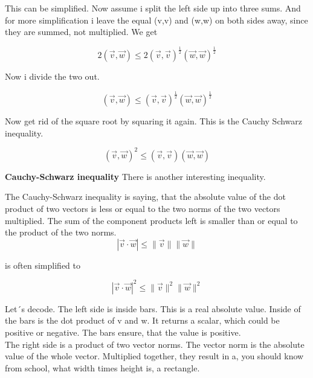 \documentclass[a4paper]{article}
\begin{document}
\begin{Example}
This can be simplified. Now assume i split the left side up into three sums. And for more simplification i leave the equal (v,v) and (w,w) on both sides away, since they are summed, not multiplied. We get

\begin{displaymath}
2(\vec{v},\vec{w}) \leq 2(\vec{v},\vec{v})^{\frac{1}{2}}(\vec{w},\vec{w})^{\frac{1}{2}}
\end{displaymath}

Now i divide the two out. 

\begin{displaymath}
(\vec{v},\vec{w}) \leq (\vec{v},\vec{v})^{\frac{1}{2}}(\vec{w},\vec{w})^{\frac{1}{2}}
\end{displaymath}

Now get rid of the square root by squaring it again. This is the Cauchy Schwarz inequality.

\begin{displaymath}
(\vec{v},\vec{w})^{2} \leq (\vec{v},\vec{v})(\vec{w},\vec{w})
\end{displaymath}


\textbf{Cauchy-Schwarz inequality} There is another interesting inequality.

The Cauchy-Schwarz inequality is saying, that the absolute value of the dot product of two vectors is less or equal to the two norms of the two vectors multiplied. The sum of the component products left is smaller than or equal to the product of the two norms.\\

\begin{displaymath}
    |\vec{v}\cdot\vec{w}| \leq \|\vec{v}\|\|\vec{w}\|
\end{displaymath}

is often simplified to

\begin{displaymath}
    |\vec{v}\cdot\vec{w}|^{2} \leq \|\vec{v}\|^{2}\|\vec{w}\|^{2}
\end{displaymath}

Let´s decode. The left side is inside bars. This is a real absolute value. Inside of the bars is the dot product of v and w. It returns a scalar, which could be positive or negative. The bars ensure, that the value is positive.\\

The right side is a product of two vector norms. The vector norm is the absolute value of the whole vector. Multiplied together, they result in a, you should know from school, what width times height is, a rectangle. \\


\end{Example}
\end{document}

